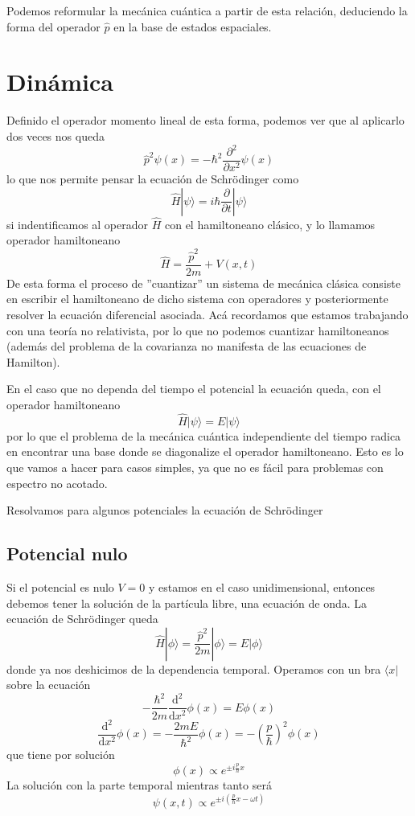 Podemos reformular la mecánica cuántica a partir de esta relación, deduciendo la forma del operador $\hat{p}$ en la base de estados espaciales.

\section{Dinámica}

Definido el operador momento lineal de esta forma, podemos ver que al aplicarlo dos veces nos queda
\[ \hat{p}^2 \psi(x) = - \hbar^2 \frac{\partial^2}{\partial x^2} \psi(x)\]
lo que nos permite pensar la ecuación de Schrödinger como
\begin{equation}
  \hat{H} |\psi\rangle = i \hbar \frac{\partial}{\partial t} |\psi\rangle
\end{equation}
si indentificamos al operador $\hat{H}$ con el hamiltoneano clásico, y lo llamamos operador hamiltoneano
\begin{equation}
\hat{H} = \frac{\hat{p}^2}{2m} + V(x, t)
\end{equation}
De esta forma el proceso de ''cuantizar'' un sistema de mecánica clásica consiste en escribir el hamiltoneano de dicho sistema con operadores y posteriormente resolver la ecuación diferencial asociada.
Acá recordamos que estamos trabajando con una teoría no relativista, por lo que no podemos cuantizar hamiltoneanos (además del problema de la covarianza no manifesta de las ecuaciones de Hamilton).

En el caso que no dependa del tiempo el potencial la ecuación queda, con el operador hamiltoneano
\begin{equation}
\hat{H} |\psi \rangle = E | \psi \rangle
\end{equation}
por lo que el problema de la mecánica cuántica independiente del tiempo radica en encontrar una base donde se diagonalize el operador hamiltoneano.
Esto es lo que vamos a hacer para casos simples, ya que no es fácil para problemas con espectro no acotado.

Resolvamos para algunos potenciales la ecuación de Schrödinger

\subsection{Potencial nulo}
Si el potencial es nulo $V = 0$ y estamos en el caso unidimensional, entonces debemos tener la solución de la partícula libre, una ecuación de onda.
La ecuación de Schrödinger queda
\[ \hat{H}|\phi\rangle = \frac{\hat{p}^2}{2m} |\phi\rangle = E |\phi\rangle \]
donde ya nos deshicimos de la dependencia temporal.
Operamos con un bra $\langle x|$ sobre la ecuación
\[ -\frac{\hbar^2}{2m} \frac{\mathrm{d}^2}{\mathrm{d}x^2} \phi(x) = E \phi(x) \]
\[ \frac{\mathrm{d}^2}{\mathrm{d}x^2} \phi(x) = - \frac{2 m E}{\hbar^2} \phi(x) = - \left(\frac{p}{\hbar}\right)^2 \phi(x)\]
que tiene por solución
\begin{equation}
    \phi(x) \propto e^{\pm i \frac{p}{\hbar} x}
\end{equation}
La solución con la parte temporal mientras tanto será
\begin{equation}
    \psi(x, t) \propto e^{\pm i \left(\frac{p}{\hbar} x - \omega t\right)}
\end{equation}

